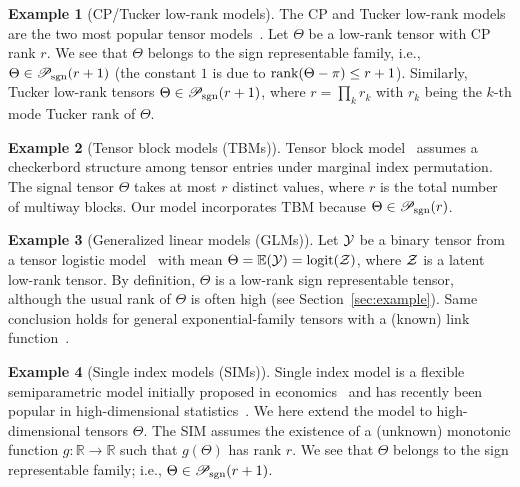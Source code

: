 \documentclass{article}
\theoremstyle{plain}
\theoremstyle{definition}
\newtheorem{example}{Example}
\def\rank{\textup{rank}}
\def\caliP{\mathscr{P}_{\textup{sgn}}}
\begin{document}
\begin{example}[CP/Tucker low-rank models] The CP and Tucker low-rank models are the two most popular tensor models~\cite{anandkumar2014tensor,montanari2018spectral,kadmon2018statistical,cai2019nonconvex}. Let $\Theta$ be a low-rank tensor with CP rank $r$. We see that $\Theta$ belongs to the sign representable family, i.e., $\Theta\in\caliP(r+1)$ (the constant $1$ is due to $\rank(\Theta-\pi)\leq r+1$). Similarly, Tucker low-rank tensors $\Theta\in\caliP(r+1)$, where $r=\prod_kr_k$ with $r_k$ being the $k$-th mode Tucker rank of $\Theta$.  
\end{example} 

\begin{example}[Tensor block models (TBMs)] Tensor block model~\cite{wang2019multiway,chi2020provable} assumes a checkerbord structure among tensor entries under marginal index permutation. The signal tensor $\Theta$ takes at most $r$ distinct values, where $r$ is the total number of multiway blocks. Our model incorporates TBM because $\Theta \in \caliP(r)$. 
\end{example}


\begin{example}[Generalized linear models (GLMs)] Let $\mathcal{Y}$ be a binary tensor from a tensor logistic model~\cite{wang2018learning} with mean $\Theta=\mathbb{E}(\mathcal{Y})=\text{logit}(\mathcal{Z})$, where $\mathcal{Z}$ is a latent low-rank tensor. By definition, $\Theta$ is a low-rank sign representable tensor, although the usual rank of $\Theta$ is often high (see Section~\ref{sec:example}). Same conclusion holds for general exponential-family tensors with a (known) link function~\cite{hong2020generalized}. 
\end{example}

\begin{example}[Single index models (SIMs)] Single index model is a flexible semiparametric model initially proposed in economics~\cite{robinson1988root} and has recently been popular in high-dimensional statistics~\cite{balabdaoui2019least,ganti2017learning,alquier2013sparse}. We here extend the model to high-dimensional tensors $\Theta$. The SIM assumes the existence of a (unknown) monotonic function $g\colon \mathbb{R}\to \mathbb{R}$ such that $g(\Theta)$ has rank $r$. We see that $\Theta$ belongs to the sign representable family; i.e., $\Theta\in \caliP(r+1)$. 
\end{example}
\end{document}
